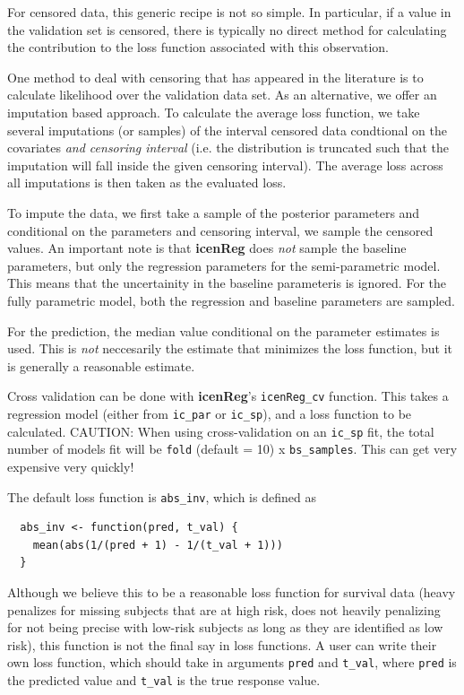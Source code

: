 \documentclass[11pt]{report}
\begin{document}
  For censored data, this generic recipe is not so simple. In particular, if 
  a value in the validation set is censored, there is typically no direct
  method for calculating the contribution to the loss function 
  associated with this observation. 
  
  One method to deal with censoring that has appeared in the literature is to calculate
  likelihood over the validation data set. As an alternative, we offer an imputation
  based approach. To calculate the
  average loss function, we take several imputations (or samples) of the 
  interval censored data condtional on the covariates \emph{and censoring interval}
  (i.e. the distribution is truncated such that the imputation will fall inside the
  given censoring interval). The average loss across all imputations is then taken
  as the evaluated loss. 
  
  To impute the data, we first take a sample of the posterior parameters and conditional
  on the parameters and censoring interval, we sample the censored values. An important
  note is that {\bf icenReg} does \emph{not} sample the baseline parameters, but only
  the regression parameters for the semi-parametric model. This means that the 
  uncertainity in the baseline parameteris is ignored. 
  For the fully parametric model, both the regression and
  baseline parameters are sampled.

  For the prediction, the median value conditional on the parameter estimates is used. 
  This is \emph{not} neccesarily the estimate that minimizes the loss function, but it 
  is generally a reasonable estimate. 
  
  Cross validation can be done with {\bf icenReg}'s \texttt{icenReg\_cv} function. 
  This takes a regression model (either from \texttt{ic\_par} or \texttt{ic\_sp}), and a
  loss function to be calculated.
  CAUTION: When using cross-validation on an \texttt{ic\_sp} fit, the total number of 
  models fit will be \texttt{fold} (default = 10) x \texttt{bs\_samples}. This can get
  very expensive very quickly!
  
  The default loss function is \texttt{abs\_inv}, which is 
  defined as 
  
  \begin{verbatim}
  abs_inv <- function(pred, t_val) {
    mean(abs(1/(pred + 1) - 1/(t_val + 1)))
  }
  \end{verbatim}

  Although we believe this to be a reasonable loss function for survival data
  (heavy penalizes for missing subjects that are at high risk, does not heavily 
  penalizing for not being precise with low-risk subjects as long as they are identified as low risk),
  this function is not the final say in loss functions. 
  A user can write their own loss function, which should take in arguments
  \texttt{pred} and \texttt{t\_val}, where \texttt{pred} is the predicted
  value and \texttt{t\_val} is the true response value. 
  
\end{document}
